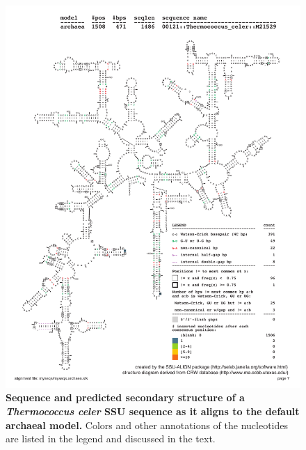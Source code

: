 \begin{figure}
  \begin{center}
\includegraphics[width=5.7in]{Figures/myseqs-archaea-indi-1}
  \end{center}
\caption{\textbf{Sequence and predicted secondary structure of
    a \emph{Thermococcus celer} SSU sequence as it aligns to the default
    archaeal model.} Colors and other annotations of the nucleotides
  are listed in the legend and discussed in the text.}
\label{fig:myseqs-archaea-indi-1}
\end{figure}

